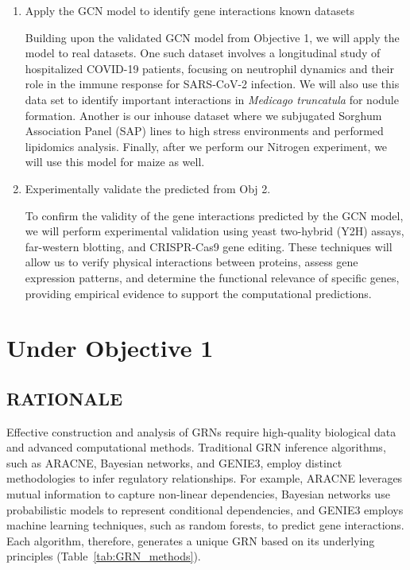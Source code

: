\documentclass{article}
\begin{document}
\begin{enumerate}
\item Apply the GCN model to identify gene interactions known datasets

Building upon the validated GCN model from Objective 1, we will apply the model to real datasets. One such dataset involves a longitudinal study of hospitalized COVID-19 patients, focusing on neutrophil dynamics and their role in the immune response for SARS-CoV-2 infection. We will also use this data set to identify important interactions in \textit{Medicago truncatula} for nodule formation. Another is our inhouse dataset where we subjugated Sorghum Association Panel (SAP) lines to high stress environments and performed lipidomics analysis. Finally, after we perform our Nitrogen experiment, we will use this model for maize as well.

\item Experimentally validate the predicted  from Obj 2. 

To confirm the validity of the gene interactions predicted by the GCN model, we will perform experimental validation using yeast two-hybrid (Y2H) assays, far-western blotting, and CRISPR-Cas9 gene editing. These techniques will allow us to verify physical interactions between proteins, assess gene expression patterns, and determine the functional relevance of specific genes, providing empirical evidence to support the computational predictions.

\end{enumerate}

\section{Under Objective 1}
\subsection{RATIONALE}
Effective construction and analysis of GRNs require high-quality biological data and advanced computational methods. Traditional GRN inference algorithms, such as ARACNE, Bayesian networks, and GENIE3, employ distinct methodologies to infer regulatory relationships. For example, ARACNE leverages mutual information to capture non-linear dependencies, Bayesian networks use probabilistic models to represent conditional dependencies, and GENIE3 employs machine learning techniques, such as random forests, to predict gene interactions. Each algorithm, therefore, generates a unique GRN based on its underlying principles (Table~\ref{tab:GRN_methods}).
\end{document}
